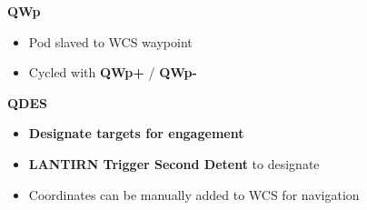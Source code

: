 \begin{tableitemize}
{\begin{subitemize}
        \item \textbf{QWp}
        \begin{itemize}
            \item Pod slaved to WCS waypoint
            \item Cycled with \textbf{QWp+} / \textbf{QWp-}
        \end{itemize}
        \item \textbf{QDES}
        \begin{itemize}
            \item \textbf{Designate targets for engagement}
            \item \textbf{LANTIRN Trigger Second Detent} to designate
            \item Coordinates can be manually added to WCS for navigation
        \end{itemize}
    \end{subitemize}}
\end{tableitemize}

\clearpage

